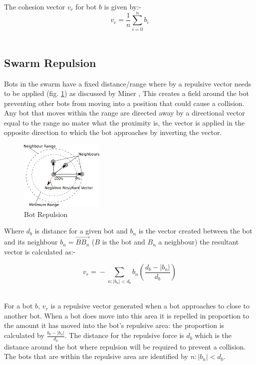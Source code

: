 \documentclass[10pt,journal,letterpaper,twoside]{IEEEtran}
\newcommand{\Fig}{fig.}
\begin{document}
The cohesion vector $v_{c}$ for bot $b$ is given by:-
\begin{equation}\label{eq:FlyToCentre1}
v_{c} = \frac{1}{n}{ \sum_{i=0}^{n}} b_i
\end{equation}‎

\subsection{Swarm Repulsion}
Bots in the swarm have a fixed distance/range where by a repulsive vector needs to be applied (\Fig{} \ref{methods:Repulsion1}) as discussed by Miner \cite{MD07}, This creates a field around the bot preventing other bots from moving into a position that could cause a collision. Any bot that moves within the range are directed away by a directional vector equal to the range no mater what the proximity is, the vector is applied in the opposite direction to which the bot approaches by inverting the vector.

\begin{figure}[H]
\begin{center}
\includegraphics[width=4cm]{figures/Repulsion1}
\caption{Bot Repulsion \label{methods:Repulsion1}}
\end{center}
\end{figure}

Where $d_b$ is distance for a given bot and $b_n$ is the vector created between the bot and its neighbour $b_n =‎ \overrightarrow{BB_n}$ ($B$ is the bot and $B_n$ a neighbour) the resultant vector is calculated as:-

\begin{equation}
\label{eq:Repulsion1}
v_{r} =‎ - \sum_{n:|b_n| < d_b^{}} {b_n} \left ( \frac{d_b - |b_n|}{d_b} \right )
\end{equation}‎

For a bot $b$, $v_{r}$ is a repulsive vector generated when a bot approaches to close to another bot. When a bot does move into this area it is repelled in proportion to the amount it has moved into the bot's repulsive area: the proportion is calculated by $\frac{b_{b} - |b_{n}|}{d_b}$. The distance for the repulsive force is $d_b$ which is the distance around the bot where repulsion will be required to prevent a collision. The bots that are within the repulsive area are identified by ${n:|b_{n}| < d_b}$.
\end{document}
